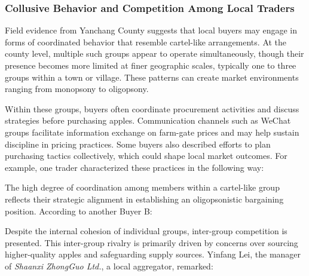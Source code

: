 \subsubsection{Collusive Behavior and Competition Among Local Traders}
\noindent 
Field evidence from Yanchang County suggests that local buyers may engage in forms of coordinated behavior that resemble cartel-like arrangements. At the county level, multiple such groups appear to operate simultaneously, though their presence becomes more limited at finer geographic scales, typically one to three groups within a town or village. These patterns can create market environments ranging from monopsony to oligopsony.

Within these groups, buyers often coordinate procurement activities and discuss strategies before purchasing apples. Communication channels such as WeChat groups facilitate information exchange on farm-gate prices and may help sustain discipline in pricing practices. Some buyers also described efforts to plan purchasing tactics collectively, which could shape local market outcomes. For example, one trader characterized these practices in the following way:

\begin{quote}
\end{quote}

The high degree of coordination among members within a cartel-like group reflects their strategic alignment in establishing an oligopsonistic bargaining position. According to another Buyer B:

\begin{quote}
\end{quote}

Despite the internal cohesion of individual groups, inter-group competition is presented. This inter-group rivalry is primarily driven by concerns over sourcing higher-quality apples and safeguarding supply sources. Yinfang Lei, the manager of \textit{Shaanxi ZhongGuo Ltd.}, a local aggregator, remarked:

